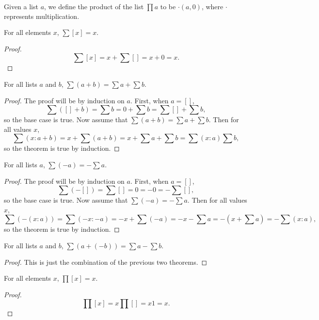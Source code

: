 \documentclass[../math.tex]{subfiles}
\begin{document}
\begin{definition}
    Given a list $a$, we define the product of the list $\prod a$ to be
    $\cdot(a, 0)$, where $\cdot$ represents multiplication.
\end{definition}

\begin{theorem}
    For all elements $x$, $\sum [x] = x$.
\end{theorem}
\begin{proof}
    \[
        \sum [x] = x + \sum [] = x + 0 = x.
    \]
\end{proof}

\begin{theorem} \label{list-sum-conc}
    For all lists $a$ and $b$, $\sum (a + b) = \sum a + \sum b$.
\end{theorem}
\begin{proof}
    The proof will be by induction on $a$.  First, when $a = []$,
    \[
        \sum ([] + b) = \sum b = 0 + \sum b = \sum [] + \sum b,
    \]
    so the base case is true.  Now assume that $\sum (a + b) = \sum a + \sum b.$
    Then for all values $x$,
    \[
        \sum(x : a + b) = x + \sum(a + b) = x + \sum a + \sum b = \sum (x : a)
        \sum b,
    \]
    so the theorem is true by induction.
\end{proof}

\begin{theorem} \label{list-sum-neg}
    For all lists $a$, $\sum (-a) = -\sum a$.
\end{theorem}
\begin{proof}
    The proof will be by induction on $a$.  First, when $a = []$,
    \[
        \sum (-[]) = \sum [] = 0 = -0 = -\sum [],
    \]
    so the base case is true.  Now assume that $\sum (-a) = -\sum a$.  Then for
    all values $x$,
    \[
        \sum (-(x : a)) = \sum(-x : -a) = -x + \sum (-a) = -x - \sum a = -(x +
        \sum a) = -\sum (x : a),
    \]
    so the theorem is true by induction.
\end{proof}

\begin{theorem} \label{list-sum-minus}
    For all lists $a$ and $b$, $\sum (a + (-b)) = \sum a - \sum b$.
\end{theorem}
\begin{proof}
    This is just the combination of the previous two theorems.
\end{proof}

\begin{theorem}
    For all elements $x$, $\prod [x] = x$.
\end{theorem}
\begin{proof}
    \[
        \prod [x] = x \prod [] = x 1 = x.
    \]
\end{proof}
\end{document}
